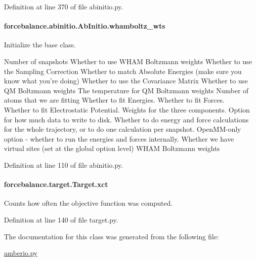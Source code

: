 Definition at line 370 of file abinitio.\-py.

\hypertarget{classforcebalance_1_1abinitio_1_1AbInitio_a885e7ef58b9e7c6abbc24321e5f3c61a}{
\paragraph[{whamboltz\-\_\-wts}]{\setlength{\rightskip}{0pt plus 5cm}forcebalance.\-abinitio.\-Ab\-Initio.\-whamboltz\-\_\-wts\hspace{0.3cm}{\ttfamily [inherited]}}}\label{classforcebalance_1_1abinitio_1_1AbInitio_a885e7ef58b9e7c6abbc24321e5f3c61a}


Initialize the base class. 

Number of snapshots Whether to use W\-H\-A\-M Boltzmann weights Whether to use the Sampling Correction Whether to match Absolute Energies (make sure you know what you're doing) Whether to use the Covariance Matrix Whether to use Q\-M Boltzmann weights The temperature for Q\-M Boltzmann weights Number of atoms that we are fitting Whether to fit Energies. Whether to fit Forces. Whether to fit Electrostatic Potential. Weights for the three components. Option for how much data to write to disk. Whether to do energy and force calculations for the whole trajectory, or to do one calculation per snapshot. Open\-M\-M-\/only option -\/ whether to run the energies and forces internally. Whether we have virtual sites (set at the global option level) W\-H\-A\-M Boltzmann weights 

Definition at line 110 of file abinitio.\-py.

\hypertarget{classforcebalance_1_1target_1_1Target_aad2e385cfbf7b4a68f1c2cb41133fe82}{
\paragraph[{xct}]{\setlength{\rightskip}{0pt plus 5cm}forcebalance.\-target.\-Target.\-xct\hspace{0.3cm}{\ttfamily [inherited]}}}\label{classforcebalance_1_1target_1_1Target_aad2e385cfbf7b4a68f1c2cb41133fe82}


Counts how often the objective function was computed. 



Definition at line 140 of file target.\-py.



The documentation for this class was generated from the following file\-:\begin{DoxyCompactItemize}
\item 
\hyperlink{amberio_8py}{amberio.\-py}\end{DoxyCompactItemize}
